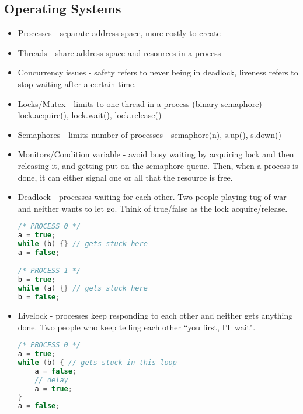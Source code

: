 \documentclass[10pt]{article}
\begin{document}
\subsection{Operating Systems}
\begin{itemize}
    \itemsep0em
    \item Processes - separate address space, more costly to create
    \item Threads - share address space and resources in a process
    \item Concurrency issues - safety refers to never being in deadlock, liveness refers to stop waiting after a certain time.
    \item Locks/Mutex - limits to one thread in a process (binary semaphore) - lock.acquire(), lock.wait(), lock.release()
    \item Semaphores - limits number of processes - semaphore(n), s.up(), s.down()
    \item Monitors/Condition variable - avoid busy waiting by acquiring lock and then releasing it, and getting put on the semaphore queue. Then, when a process is done, it can either signal one or all that the resource is free.
    \item Deadlock - processes waiting for each other. Two people playing tug of war and neither wants to let go. Think of true/false as the lock acquire/release.
    \begin{lstlisting}[language=c]
/* PROCESS 0 */
a = true; 
while (b) {} // gets stuck here
a = false; 

/* PROCESS 1 */
b = true;
while (a) {} // gets stuck here
b = false;
    \end{lstlisting}
    \item Livelock - processes keep responding to each other and neither gets anything done. Two people who keep telling each other ``you first, I'll wait".
\begin{lstlisting}[language=c]
/* PROCESS 0 */
a = true; 
while (b) { // gets stuck in this loop
    a = false;
    // delay
    a = true;
}
a = false; 


\end{lstlisting}
\end{itemize}
\end{document}

